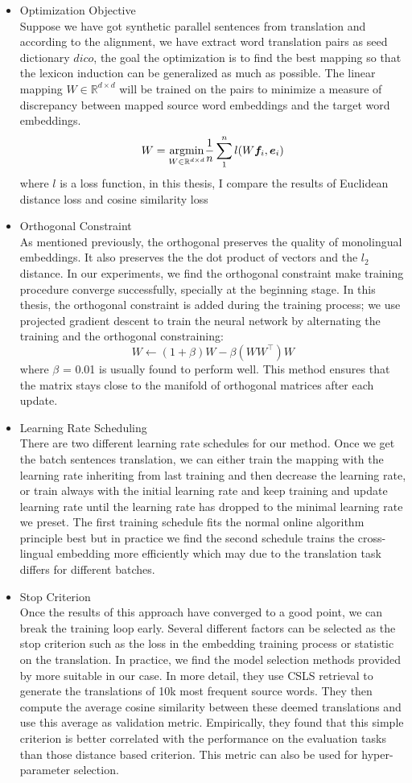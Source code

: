 \begin{itemize}
	
	\item Optimization Objective \\
	Suppose we have got synthetic parallel sentences from translation and according to the alignment, we have extract word translation pairs as seed dictionary $dico$, the goal the optimization is to find the best mapping so that the lexicon induction can be generalized as much as possible. The linear mapping $W \in \mathbb{R}^{d \times d}$ will be trained on the pairs to minimize a measure of discrepancy between mapped  source word embeddings and the target word embeddings.
	\[ W = \underset{W \in \mathbb{R}^{d \times d}}{\operatorname{argmin}} \frac{1}{n} \sum_1^n l(W\bm{f}_i, \bm{e}_i) \]
	where $l$ is a loss function, in this thesis, I compare the results of Euclidean distance loss and cosine similarity loss 
	\item Orthogonal Constraint\\
	As mentioned previously, the orthogonal preserves the quality of monolingual embeddings. It also preserves the the dot product of vectors and the $l_2$ distance. In our experiments, we find the orthogonal constraint make training procedure converge successfully, specially at the beginning stage. In this thesis, the orthogonal constraint is added during the training process; we use projected gradient descent to train the neural network by alternating the training and the orthogonal constraining:
\[ W \leftarrow (1+\beta) W - \beta(WW^\top)W\] 
	where $\beta$ = 0.01  is usually found to perform well.  This method ensures that the matrix stays close to the manifold of orthogonal matrices after each update. 	
	\item Learning Rate Scheduling\\
	There are two different learning rate schedules for our method. Once we get the batch sentences translation, we can either train the mapping with the learning rate inheriting from last training and then decrease the learning rate, or train always with the initial learning rate and keep training and update learning rate until the learning rate has dropped to the minimal learning rate we preset. The first training schedule fits the normal online algorithm principle best but in practice we find the second schedule trains the cross-lingual embedding more efficiently which may due to the translation task differs for different batches.
	\item Stop Criterion\\
	Once the results of this approach have converged to a good point, we can break the training loop early. Several different factors can be selected as the stop criterion such as the loss in the embedding training process or statistic on the translation. In practice, we find the model selection methods provided by \cite{conneau2017word} more suitable in our case. In more detail, they use CSLS retrieval to generate the translations of 10k most frequent source words. They then compute the average cosine similarity between these deemed translations and use this average as validation metric. Empirically, they found that this simple criterion is better correlated with the performance on the evaluation tasks than those distance based criterion. This metric can also be used for hyper-parameter selection.
\end{itemize}
